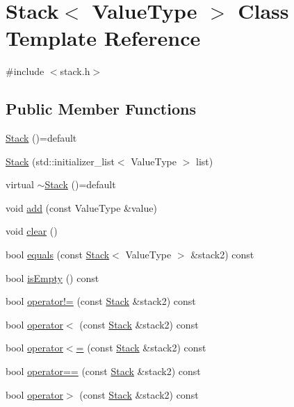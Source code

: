 \hypertarget{classStack}{}\section{Stack$<$ Value\+Type $>$ Class Template Reference}
\label{classStack}


{\ttfamily \#include $<$stack.\+h$>$}

\subsection*{Public Member Functions}
\begin{DoxyCompactItemize}
\item 
\mbox{\hyperlink{classStack_a3fc38470bd349e85c6995ba03e6284c8}{Stack}} ()=default
\item 
\mbox{\hyperlink{classStack_aecafaaaa5e02b2c138a10f6482963634}{Stack}} (std\+::initializer\+\_\+list$<$ Value\+Type $>$ list)
\item 
virtual \mbox{\hyperlink{classStack_aa757fa42027d1b9690c567ff38c65708}{$\sim$\+Stack}} ()=default
\item 
void \mbox{\hyperlink{classStack_ab901606bf3a8019c986f0cf9a9f298dc}{add}} (const Value\+Type \&value)
\item 
void \mbox{\hyperlink{classStack_ac8bb3912a3ce86b15842e79d0b421204}{clear}} ()
\item 
bool \mbox{\hyperlink{classStack_a8a06f9a4f35024fe7f29b0f87dd9a711}{equals}} (const \mbox{\hyperlink{classStack}{Stack}}$<$ Value\+Type $>$ \&stack2) const
\item 
bool \mbox{\hyperlink{classStack_acf82f9b2937375c7b1cf3dccb3df3312}{is\+Empty}} () const
\item 
bool \mbox{\hyperlink{classStack_a21017a086067b8ac1c21c3bdef97a100}{operator!=}} (const \mbox{\hyperlink{classStack}{Stack}} \&stack2) const
\item 
bool \mbox{\hyperlink{classStack_a6d1900aec1af12a907ad87301d464d2e}{operator$<$}} (const \mbox{\hyperlink{classStack}{Stack}} \&stack2) const
\item 
bool \mbox{\hyperlink{classStack_a8037a3a4cc044bcfba994893d6f4ab12}{operator$<$=}} (const \mbox{\hyperlink{classStack}{Stack}} \&stack2) const
\item 
bool \mbox{\hyperlink{classStack_ade246b6899202c53b8fd8fbe4930b09a}{operator==}} (const \mbox{\hyperlink{classStack}{Stack}} \&stack2) const
\item 
bool \mbox{\hyperlink{classStack_a5031b32af5984055de8e2bdd4f7312c4}{operator$>$}} (const \mbox{\hyperlink{classStack}{Stack}} \&stack2) const

\end{DoxyCompactItemize}
